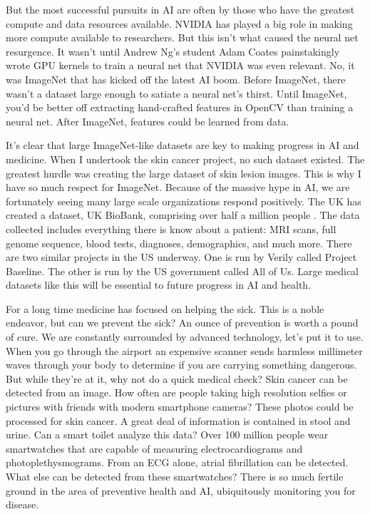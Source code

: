 But the most successful pursuits in AI are often by those who have the greatest compute and data resources available.  NVIDIA has played a big role in making more compute available to researchers.  But this isn't what caused the neural net resurgence.  It wasn't until Andrew Ng's student Adam Coates painstakingly wrote GPU kernels to train a neural net \cite{coates2013deep} that NVIDIA was even relevant.  No, it was ImageNet that has kicked off the latest AI boom.  Before ImageNet, there wasn't a dataset large enough to satiate a neural net's thirst.  Until ImageNet, you'd be better off extracting hand-crafted features in OpenCV than training a neural net.  After ImageNet, features could be learned from data.

It's clear that large ImageNet-like datasets are key to making progress in AI and medicine.  When I undertook the skin cancer project, no such dataset existed.  The greatest hurdle was creating the large dataset of skin lesion images.  This is why I have so much respect for ImageNet.  Because of the massive hype in AI, we are fortunately seeing many large scale organizations respond positively.  The UK has created a dataset, UK BioBank, comprising over half a million people \cite{sudlow2015uk}.  The data collected includes everything there is know about a patient: MRI scans, full genome sequence, blood tests, diagnoses, demographics, and much more.  There are two similar projects in the US underway.  One is run by Verily called Project Baseline.  The other is run by the US government called All of Us.  Large medical datasets like this will be essential to future progress in AI and health.

For a long time medicine has focused on helping the sick.  This is a noble endeavor, but can we prevent the sick?  An ounce of prevention is worth a pound of cure.  We are constantly surrounded by advanced technology, let's put it to use.  When you go through the airport an expensive scanner sends harmless millimeter waves through your body to determine if you are carrying something dangerous.  But while they're at it, why not do a quick medical check?  Skin cancer can be detected from an image.  How often are people taking high resolution selfies or pictures with friends with modern smartphone cameras?  These photos could be processed for skin cancer.  A great deal of information is contained in stool and urine.  Can a smart toilet analyze this data?  Over 100 million people wear smartwatches that are capable of measuring electrocardiograms and photoplethysmograms.  From an ECG alone, atrial fibrillation can be detected.  What else can be detected from these smartwatches?  There is so much fertile ground in the area of preventive health and AI, ubiquitously monitoring you for disease.

